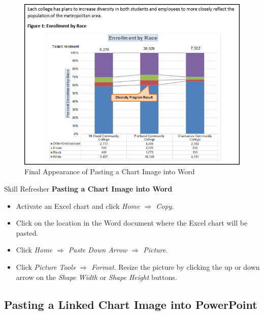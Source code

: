 \begin{figure}[H]
	\centering
	\includegraphics[width=\maxwidth{.95\linewidth}]{gfx/ch04_fig48}
	\caption{Final Appearance of Pasting a Chart Image into Word}
	\label{04:fig48}
\end{figure}

\begin{center}
	\begin{sklbox}{Skill Refresher}
		\textbf{Pasting a Chart Image into Word}
		\\
		\begin{itemize}
			\setlength{\itemsep}{0pt}
			\setlength{\parskip}{0pt}
			\setlength{\parsep}{0pt}

			\item Activate an Excel chart and click \textit{Home $ \Rightarrow $ Copy}.
			\item Click on the location in the Word document where the Excel chart will be pasted.
			\item Click \textit{Home $ \Rightarrow $ Paste Down Arrow $ \Rightarrow $ Picture}.
			\item Click \textit{Picture Tools $ \Rightarrow $ Format}. Resize the picture by clicking the up or down arrow on the \textit{Shape Width} or \textit{Shape Height} buttons.
			
		\end{itemize}
	\end{sklbox}
\end{center}

\subsection{Pasting a Linked Chart Image into PowerPoint}

